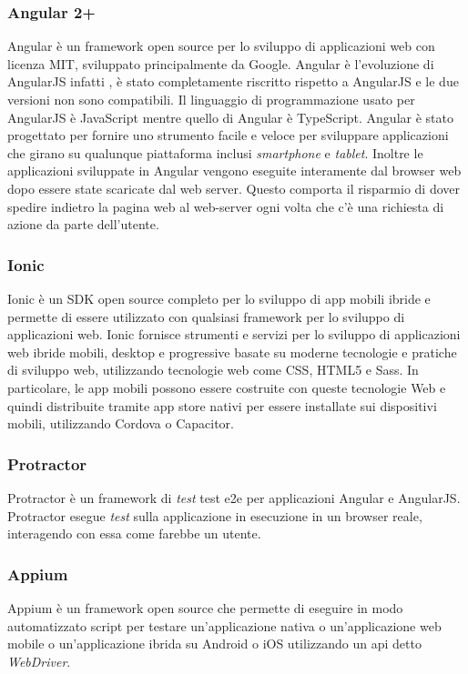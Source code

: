 \subsubsection*{Angular 2+}
Angular è un framework open source per lo sviluppo di applicazioni web con \gls{licenza MIT}\ap{[g]}, sviluppato principalmente da Google. Angular è l'evoluzione di AngularJS infatti , è stato completamente riscritto rispetto a AngularJS e le due versioni non sono compatibili. Il linguaggio di programmazione usato per AngularJS è JavaScript mentre quello di Angular è TypeScript. Angular è stato progettato per fornire uno strumento facile e veloce per sviluppare applicazioni che girano su qualunque piattaforma inclusi \emph{smartphone} e \emph{tablet}. Inoltre le applicazioni sviluppate in Angular vengono eseguite interamente dal \gls{browser web}\ap{[g]} dopo essere state scaricate dal web server. Questo comporta il risparmio di dover spedire indietro la pagina web al web-server ogni volta che c'è una richiesta di azione da parte dell'utente. 

\subsubsection*{Ionic}
Ionic è un SDK open source completo per lo sviluppo di app mobili ibride e permette di essere utilizzato con qualsiasi framework per lo sviluppo di applicazioni web. Ionic fornisce strumenti e servizi per lo sviluppo di applicazioni web ibride mobili, desktop e progressive basate su moderne tecnologie e pratiche di sviluppo web, utilizzando tecnologie web come CSS, HTML5 e Sass. In particolare, le app mobili possono essere costruite con queste tecnologie Web e quindi distribuite tramite app store nativi per essere installate sui dispositivi mobili, utilizzando Cordova o Capacitor. 

\subsubsection*{Protractor}
Protractor è un \gls{framework}\ap{[g]} di \emph{test} \gls{test e2e}\ap{[g]} per applicazioni Angular e AngularJS. Protractor esegue \emph{test} sulla applicazione in esecuzione in un browser reale, interagendo con essa come farebbe un utente.

\subsubsection*{Appium}
Appium è un \gls{framework}\ap{[g]} open source che permette di eseguire in modo automatizzato script per testare un'\gls{applicazione nativa}\ap{[g]} o un'\gls{applicazione web mobile}\ap{[g]} o un'\gls{applicazione ibrida}\ap{[g]} su \gls{Android}\ap{[g]} o \gls{iOS}\ap{[g]} utilizzando un \gls{api}\ap{[g]} detto \emph{WebDriver}.

